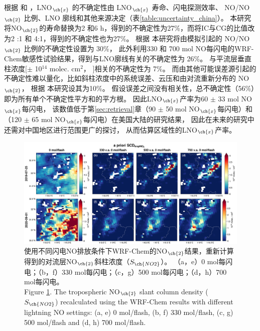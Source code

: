 根据 \citet{Allen.2019} 和 \citet{Zhang.2020b}，LNO$_{\ch{x}}$ 的不确定性由 LNO$_{\ch{x}}$ 寿命、闪电探测效率、
NO/NO$_{\ch{2}}$ 比例、LNO 廓线和其他来源决定（表\ref{table:uncertainty_china}）。
本研究将NO$_{\ch{2}}$的寿命替换为2 和6 h，得到的不确定性为27\%，而将IC与CG的比值改为2 :1 和 4:1，得到的不确定性也为27\%。
根据 \citet{Allen.2019} 本研究将由模拟引起的 NO/NO$_{\ch{2}}$ 比例的不确定性设置为 30\%，
此外利用330 和 700 mol NO每闪电的WRF-Chem敏感性试验结果，得到与LNO廓线有关的不确定性为 26\%。
与平流层垂直柱浓度[$\pm$ 10$^{14}$ molec. cm$^2$， \citet{VanGeffen.2022}]相关的不确定性为 7\%。
而由其他可能误差源引起的不确定性难以量化，比如斜柱浓度中的系统误差、云压和由对流重新分布的 NO$_{\ch{2}}$，
根据 \citet{Allen.2021a}本研究设其为10\%。
假设误差之间没有相关性，总不确定性（56\%）即为所有单个不确定性平方和的平方根。
因此LNO$_{\ch{x}}$产率为60 $\pm$ 33 mol NO$_{\ch{x}}$每闪电，
该数值低于第\ref{sec:retrieval}章（90 $\pm$ 50 mol NO$_{\ch{x}}$每闪电）和\citet{Allen.2021a}（120 $\pm$ 65 mol NO$_{\ch{x}}$每闪电）在美国大陆的研究结果，
因此在未来的研究中还需对中国地区进行范围更广的探讨，
从而估算区域性的LNO$_{\ch{x}}$产率。


\begin{landscape}
\vspace*{\fill}
\begin{figure}[H]
    \centering
    \includegraphics[width=0.9\columnwidth]{./figures/s5p_apriori_scd.png}
    \caption{使用不同闪电NO排放条件下WRF-Chem的NO$_{\ch{2}}$结果，重新计算得到的对流层NO$_{\ch{2}}$斜柱浓度（$S_{\ch{NO2}}$）。
    （a，e）0 mol每闪电；（b，f）330 mol每闪电；（c，g）500 mol每闪电；（d，h）700 mol每闪电。\\
    Figure \ref{fig:s5p_apriori_scd}. The tropospheric NO$_{\ch{2}}$ slant column density ($S_{\ch{NO2}}$) recalculated using the WRF-Chem results with different lightning NO settings: (a, e) 0 mol/flash, (b, f) 330 mol/flash, (c, g) 500 mol/flash and (d, h) 700 mol/flash.
    }
    \label{fig:s5p_apriori_scd}
\end{figure}
\vspace*{\fill}
\end{landscape}

